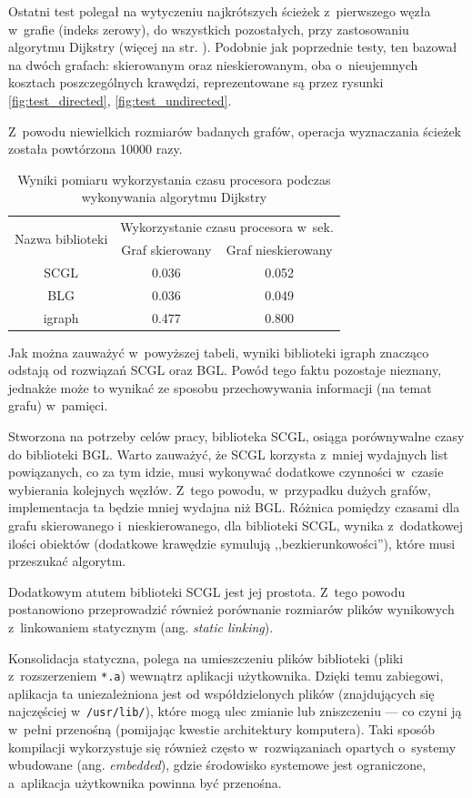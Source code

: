 \documentclass[a4paper,12pt,polish,twoside,openright]{thesis}
\newcommand\code[1]{\lstinline[style=line]{#1}}
\begin{document}
Ostatni test polegał na wytyczeniu najkrótszych ścieżek z~pierwszego węzła w~grafie (indeks zerowy), do wszystkich pozostałych, przy zastosowaniu algorytmu Dijkstry (więcej na str. \pageref{chap:dijkstra}).
Podobnie jak poprzednie testy, ten bazował na dwóch grafach: skierowanym oraz nieskierowanym, oba o~nieujemnych kosztach poszczególnych krawędzi, reprezentowane są przez rysunki \ref{fig:test_directed}, \ref{fig:test_undirected}.

Z~powodu niewielkich rozmiarów badanych grafów, operacja wyznaczania ścieżek została powtórzona 10000 razy.

\begin{table}[htb]
\caption{Wyniki pomiaru wykorzystania czasu procesora podczas wykonywania algorytmu Dijkstry}
\label{tab:dijkstra}
\centering
\begin{tabular}{ | c | c | c | }
	\hline
	\multirow{2}{*}{Nazwa biblioteki } & \multicolumn{2}{|c|}{Wykorzystanie czasu procesora w~sek.} \\
	\cline{2-3}
		& Graf skierowany & Graf nieskierowany \\
	\hline \hline
	SCGL    & 0.036 & 0.052 \\ \hline
	BLG     & 0.036 & 0.049 \\ \hline
	igraph  & 0.477 & 0.800 \\ \hline
\end{tabular}
\end{table}
Jak można zauważyć w~powyższej tabeli, wyniki biblioteki igraph znacząco odstają od rozwiązań SCGL oraz BGL.
Powód tego faktu pozostaje nieznany, jednakże może to wynikać ze sposobu przechowywania informacji (na temat grafu) w~pamięci.

Stworzona na potrzeby celów pracy, biblioteka SCGL, osiąga porównywalne czasy do biblioteki BGL.
Warto zauważyć, że SCGL korzysta z~mniej wydajnych list powiązanych, co za tym idzie, musi wykonywać dodatkowe czynności w~czasie wybierania kolejnych węzłów.
Z~tego powodu, w~przypadku dużych grafów, implementacja ta będzie mniej wydajna niż BGL.
Różnica pomiędzy czasami dla grafu skierowanego i~nieskierowanego, dla biblioteki SCGL, wynika z~dodatkowej ilości obiektów (dodatkowe krawędzie symulują ,,bezkierunkowości''), które musi przeszukać algorytm.

Dodatkowym atutem biblioteki SCGL jest jej prostota.
Z~tego powodu postanowiono przeprowadzić również porównanie rozmiarów plików wynikowych z~linkowaniem statycznym (ang. \emph{static linking}).

Konsolidacja statyczna, polega na umieszczeniu plików biblioteki (pliki z~rozszerzeniem \code{*.a}) wewnątrz aplikacji użytkownika.
Dzięki temu zabiegowi, aplikacja ta uniezależniona jest od współdzielonych plików (znajdujących się najczęściej w~\code{/usr/lib/}), które mogą ulec zmianie lub zniszczeniu --- co czyni ją w~pełni przenośną (pomijając kwestie architektury komputera).
Taki sposób kompilacji wykorzystuje się również często w~rozwiązaniach opartych o~systemy wbudowane (ang. \emph{embedded}), gdzie środowisko systemowe jest ograniczone, a~aplikacja użytkownika powinna być przenośna.
\end{document}
